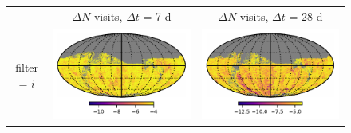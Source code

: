 \documentclass[preprintm,linenumbers]{aastex631}
\begin{document}
		\begin{figure}
			\centering
			\begin{tabular}{@{}c@{}c@{}c@{}}
				& $\Delta N$ visits, $\Delta t$ = 7 d & $\Delta N$ visits, $\Delta t$ = 28 d \\			
				filter = $i$ & \includegraphics[align=t]{results/skymaps/skymaps_delta_first_year_one_snap_v4_0_10yrs_db_noDD_noTwi_CountMetric_doAllTemplateMetrics_reduceCount_i_7_noDD_noTwi} &				
				\includegraphics[align=t]{results/skymaps/skymaps_delta_first_year_one_snap_v4_0_10yrs_db_noDD_noTwi_CountMetric_doAllTemplateMetrics_reduceCount_i_28_noDD_noTwi} \\
				

\end{tabular}
\end{figure}
\end{document}
